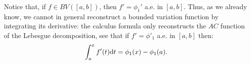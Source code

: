 Notice that, if $f\in BV([a,b])$, then $f'=\phi_1'$ a.e. in $[a,b]$. Thus, as we already know, we cannot in general reconstruct a bounded variation function by integrating its derivative: the calculus formula only reconstructs the $AC$ function of the Lebesgue decomposition, see that if $f' = \phi'_1$ a.e. in $[a,b]$ then: $$\int_a^x f'(t) \mathrm d t = \phi_1(x) - \phi_1(a).$$
